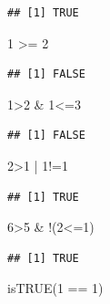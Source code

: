 \documentclass[
]{book}
\newenvironment{Shaded}{\begin{snugshade}}{\end{snugshade}}
\newcommand{\DecValTok}[1]{\textcolor[rgb]{0.00,0.00,0.81}{#1}}
\newcommand{\FunctionTok}[1]{\textcolor[rgb]{0.00,0.00,0.00}{#1}}
\newcommand{\NormalTok}[1]{#1}
\newcommand{\SpecialCharTok}[1]{\textcolor[rgb]{0.00,0.00,0.00}{#1}}
\begin{document}
\begin{verbatim}
## [1] TRUE
\end{verbatim}

\begin{Shaded}
\begin{Highlighting}[]
\DecValTok{1} \SpecialCharTok{\textgreater{}=} \DecValTok{2}
\end{Highlighting}
\end{Shaded}

\begin{verbatim}
## [1] FALSE
\end{verbatim}

\begin{Shaded}
\begin{Highlighting}[]
\DecValTok{1}\SpecialCharTok{\textgreater{}}\DecValTok{2} \SpecialCharTok{\&} \DecValTok{1}\SpecialCharTok{\textless{}=}\DecValTok{3}
\end{Highlighting}
\end{Shaded}

\begin{verbatim}
## [1] FALSE
\end{verbatim}

\begin{Shaded}
\begin{Highlighting}[]
\DecValTok{2}\SpecialCharTok{\textgreater{}}\DecValTok{1} \SpecialCharTok{|} \DecValTok{1}\SpecialCharTok{!=}\DecValTok{1}
\end{Highlighting}
\end{Shaded}

\begin{verbatim}
## [1] TRUE
\end{verbatim}

\begin{Shaded}
\begin{Highlighting}[]
\DecValTok{6}\SpecialCharTok{\textgreater{}}\DecValTok{5} \SpecialCharTok{\&} \SpecialCharTok{!}\NormalTok{(}\DecValTok{2}\SpecialCharTok{\textless{}=}\DecValTok{1}\NormalTok{)}
\end{Highlighting}
\end{Shaded}

\begin{verbatim}
## [1] TRUE
\end{verbatim}

\begin{Shaded}
\begin{Highlighting}[]
\FunctionTok{isTRUE}\NormalTok{(}\DecValTok{1} \SpecialCharTok{==} \DecValTok{1}\NormalTok{)}
\end{Highlighting}
\end{Shaded}
\end{document}
